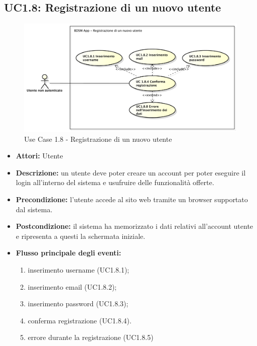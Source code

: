\clearpage


\subsection{UC1.8: Registrazione di un nuovo utente}

\begin{figure}[!htbp]
    \centering
    \centerline{\includegraphics[scale=0.45]{./images/UC1_8.pdf}}
    \caption{Use Case 1.8 - Registrazione di un nuovo utente}
\end{figure}

\begin{itemize}
    \item \textbf{Attori:} Utente
    \item \textbf{Descrizione:} un utente deve poter creare un account per poter eseguire il login
    all’interno del sistema e usufruire delle funzionalità offerte.
    \item \textbf{Precondizione:} l'utente accede al sito web tramite un browser supportato
    dal sistema.
    \item \textbf{Postcondizione:} il sistema ha memorizzato i dati relativi all’account utente e
    ripresenta a questi la schermata iniziale.
    \item \textbf{Flusso principale degli eventi:}

    \begin{enumerate}
        \item inserimento username (UC1.8.1);
        \item inserimento email (UC1.8.2);
        \item inserimento password (UC1.8.3);
        \item conferma registrazione (UC1.8.4).
        \item errore durante la registrazione (UC1.8.5)
    \end{enumerate}

\end{itemize}


